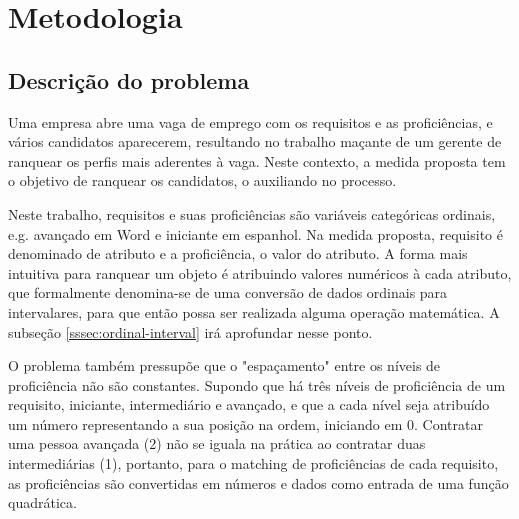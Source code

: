 \documentclass[preprint,12pt]{elsarticle}
\begin{document}
\section{Metodologia}
\label{sec:sample3}

\subsection{Descrição do problema}

Uma empresa abre uma vaga de emprego com os requisitos e as proficiências, e vários candidatos aparecerem, resultando no trabalho maçante de um gerente de ranquear os perfis mais aderentes à vaga. Neste contexto, a medida proposta tem o objetivo de ranquear os candidatos, o auxiliando no processo.


Neste trabalho, requisitos e suas proficiências são variáveis categóricas ordinais, e.g. avançado em Word e iniciante em espanhol. Na medida proposta, requisito é denominado de atributo e a proficiência, o valor do atributo. A forma mais intuitiva para ranquear um objeto é atribuindo valores numéricos à cada atributo, que formalmente denomina-se de uma conversão de dados ordinais para intervalares, para que então possa ser realizada alguma operação matemática. A subseção \ref{sssec:ordinal-interval} irá aprofundar nesse ponto.

O problema também pressupõe que o "espaçamento" entre os níveis de proficiência não são constantes. Supondo que há três níveis de proficiência de um requisito, iniciante, intermediário e avançado, e que a cada nível seja atribuído um número representando a sua posição na ordem, iniciando em 0. Contratar uma pessoa avançada (2) não se iguala na prática ao contratar duas intermediárias (1), portanto, para o matching de proficiências de cada requisito, as proficiências são convertidas em números e dados como entrada de uma função quadrática. 
\end{document}
